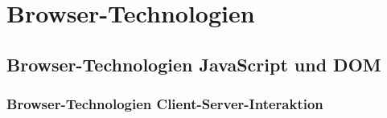 \section{Browser-Technologien}

\subsection{Browser-Technologien JavaScript und DOM}

\subsubsection{Browser-Technologien Client-Server-Interaktion}